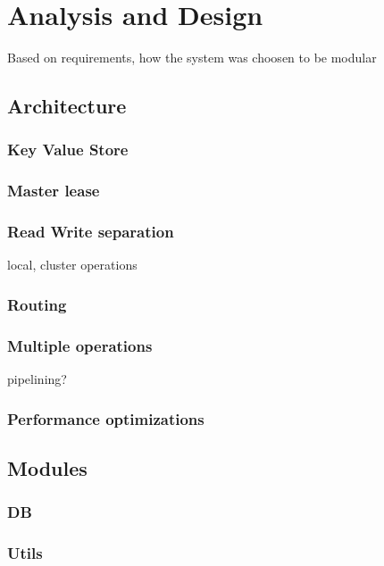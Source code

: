 \chapter{Analysis and Design}
\label{chapter:analysis.design}

Based on requirements, how the system was choosen to be modular

\section{Architecture}

\subsection{Key Value Store}

\subsection{Master lease}

\subsection{Read Write separation}

local, cluster operations

\subsection{Routing}

\subsection{Multiple operations}

pipelining?

\subsection{Performance optimizations}

\section{Modules}

\subsection{DB}

\subsection{Utils}

